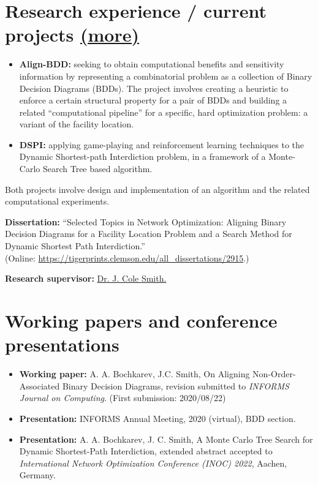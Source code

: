 \documentclass[11pt]{article} \usepackage{geometry} %
\newcommand{\mhref}[1]{\hfill\href{#1}{\small (more\faExternalLink*)}}
\begin{document}
  \section*{Research experience / current projects \mhref{https://www.bochkarev.io/research/}}
  \begin{itemize}
    \itemsep0pt
  \item \textbf{Align-BDD:} seeking to obtain computational benefits and
    sensitivity information by representing a combinatorial problem as a
    collection of Binary Decision Diagrams (BDDs). The project involves creating a heuristic to enforce a
    certain structural property for a pair of BDDs and building a related
    ``computational pipeline'' for a specific, hard optimization problem: a
    variant of the facility location. 
  \item \textbf{DSPI:} applying game-playing and reinforcement
    learning techniques to the Dynamic Shortest-path Interdiction problem,
    in a framework of a Monte-Carlo Search Tree based algorithm.
  \end{itemize} 
  Both projects involve design and implementation of an algorithm and
  the related computational experiments.\vspace{0.5em}

  \noindent\textbf{Dissertation:} ``Selected Topics in Network Optimization:
  Aligning Binary Decision Diagrams for a Facility Location Problem and a Search
  Method for Dynamic Shortest Path Interdiction.''\\
  \noindent (Online: \href{https://tigerprints.clemson.edu/all_dissertations/2915}{https://tigerprints.clemson.edu/all\_dissertations/2915}.)
  \vspace{0.5em}

  \noindent\textbf{Research supervisor:}
  \href{https://scholar.google.com/citations?user=87CaUHYAAAAJ&hl=en}{Dr. J. Cole
    Smith.}
  \vspace{1.5em}

 \section*{Working papers and conference presentations}
 \begin{itemize}
    \itemsep0pt
    \item \textbf{Working paper:} A. A. Bochkarev, J.C. Smith, On Aligning
    Non-Order-Associated Binary Decision Diagrams, revision submitted to
    \textit{INFORMS Journal on Computing}. (First submission: 2020/08/22)
    \item \textbf{Presentation:} INFORMS Annual Meeting, 2020 (virtual), BDD section.
    \item \textbf{Presentation:} A. A. Bochkarev, J. C. Smith, A Monte Carlo
      Tree Search for Dynamic Shortest-Path Interdiction, extended abstract
      accepted to \textit{International Network Optimization Conference (INOC)
        2022}, Aachen, Germany.
 \end{itemize}
\end{document}
